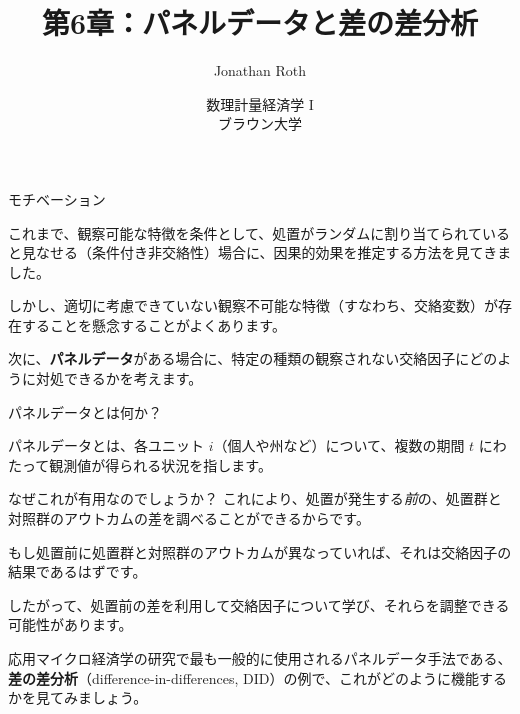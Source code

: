\documentclass[11pt,handout]{beamer}
\newenvironment{wideitemize}{\itemize\addtolength{\itemsep}{10pt}}{\enditemize}
\begin{document}
	
	\begin{frame}[noframenumbering]{}
		\vspace{0.5cm}
		\title[]{第6章：パネルデータと差の差分析}
		\author{Jonathan Roth}
		\date{数理計量経済学 I \\ ブラウン大学\\} 
		\titlepage {\small{}\ }\thispagestyle{empty} \vspace{-30pt}
		
	\end{frame}

	
	\begin{frame}{モチベーション}
		
		\begin{wideitemize}
			\item
			これまで、観察可能な特徴を条件として、処置がランダムに割り当てられていると見なせる（条件付き非交絡性）場合に、因果的効果を推定する方法を見てきました。
			
			\item
			しかし、適切に考慮できていない観察不可能な特徴（すなわち、交絡変数）が存在することを懸念することがよくあります。
			
			\pause
			\item
			次に、\textbf{パネルデータ}がある場合に、特定の種類の観察されない交絡因子にどのように対処できるかを考えます。

			
		\end{wideitemize}

	\end{frame}

\begin{frame}{パネルデータとは何か？}
	\begin{wideitemize}
	\item
	パネルデータとは、各ユニット $i$（個人や州など）について、複数の期間 $t$ にわたって観測値が得られる状況を指します。
	
	\pause
	\item
	なぜこれが有用なのでしょうか？ これにより、処置が発生する\textit{前}の、処置群と対照群のアウトカムの差を調べることができるからです。
	
	\pause
	\item
	もし処置前に処置群と対照群のアウトカムが異なっていれば、それは交絡因子の結果であるはずです。
	
	\pause
	\item
	したがって、処置前の差を利用して交絡因子について学び、それらを調整できる可能性があります。
	
	\pause
	\item
	応用マイクロ経済学の研究で最も一般的に使用されるパネルデータ手法である、\textbf{差の差分析}（difference-in-differences, DID）の例で、これがどのように機能するかを見てみましょう。
	\end{wideitemize}

\end{frame}	
\end{document}
